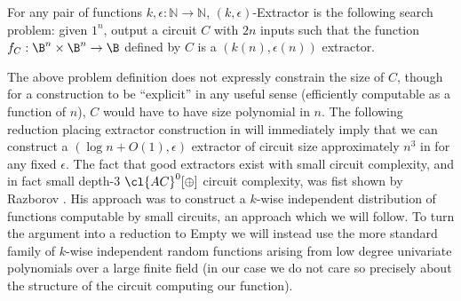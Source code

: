 \begin{definition}
For any pair of functions $k, \epsilon: \mathbb{N} \rightarrow \mathbb{N}$, {\sc $(k,\epsilon)$-Extractor} is the following search problem: given $1^n$, output a circuit $C$ with $2n$ inputs such that the function $f_C: \B^n \times \B^n \rightarrow \B$ defined by $C$ is a $(k(n),\epsilon(n))$ extractor.
\end{definition}

The above problem definition does not expressly constrain the size of $C$, though for a construction to be ``explicit'' in any useful sense (efficiently computable as a function of $n$), $C$ would have to have size polynomial in $n$. The following reduction placing extractor construction in  will immediately imply that we can construct a $(\log n + O(1), \epsilon)$ extractor of circuit size approximately $n^3$ in  for any fixed $\epsilon$. The fact that good extractors exist with small circuit complexity, and in fact small depth-3 $\cl{AC}^0[\oplus]$ circuit complexity, was fist shown by Razborov \cite{razborov-ramsey}. His approach was to construct a $k$-wise independent distribution of functions computable by small circuits, an approach which we will follow. To turn the argument into a reduction to {\sc Empty} we will instead use the more standard family of $k$-wise independent random functions arising from low degree univariate polynomials over a large finite field (in our case we do not care so precisely about the structure of the circuit computing our function).

